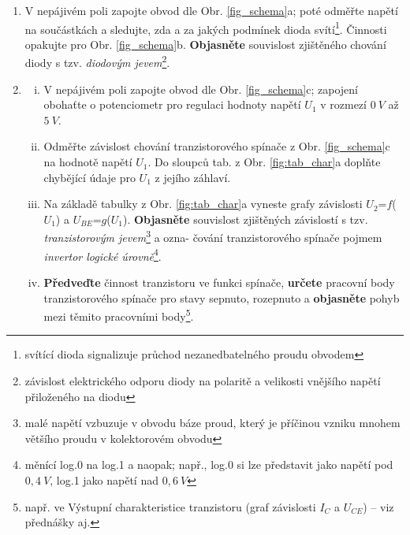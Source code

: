 \documentclass[a4paper, 11pt]{report}
\begin{document}
\begin{enumerate}[\bf {Experiment} 1:]

\item 
V nepájivém poli zapojte obvod dle Obr. \ref{fig_schema}a; 
poté
odměřte napětí na součástkách 
a sledujte, zda a za jakých podmínek dioda svítí\footnote{svítící dioda signalizuje průchod nezanedbatelného proudu obvodem}.
Činnosti opakujte pro Obr. \ref{fig_schema}b.
{\bf Objasněte} souvislost zjištěného chování diody s tzv. \emph{diodovým jevem}\footnote{závislost elektrického odporu diody na polaritě a velikosti vnějšího napětí přiloženého na diodu}.

\item 
\begin{enumerate}[i)]
\item
V nepájivém poli zapojte obvod dle Obr. \ref{fig_schema}c; 
zapojení obohaťte o potenciometr pro regulaci hodnoty napětí $U_1$
v rozmezí $0~V$ až $5~V$.

\item
Odměřte závislost chování tranzistorového spínače z Obr. \ref{fig_schema}c
na hodnotě napětí $U_1$. 
Do sloupců tab. z Obr. \ref{fig:tab_char}a 
doplňte 
chybějící údaje pro $U_1$ z jejího záhlaví.

\item Na základě tabulky z Obr. \ref{fig:tab_char}a vyneste grafy závislosti $U_2$=$f$($U_1$) a $U_{BE}$=$g$($U_1$).
{\bf Objasněte} souvislost zjištěných závislostí s tzv. \emph{tranzistorovým jevem}\footnote{malé napětí vzbuzuje v obvodu báze proud, který je příčinou vzniku mnohem většího proudu v kolektorovém obvodu}
a
ozna- čování tranzistorového spínače pojmem \emph{invertor logické úrovně}\footnote{měnící log.0 na log.1 a naopak; např., log.0 si lze představit jako napětí pod $0,4~V$, log.1 jako napětí nad $0,6~V$}.

\item 
{\bf Předveďte} činnost tranzistoru ve funkci spínače, 
{\bf určete} 
pracovní body 
tranzistorového spínače
pro stavy sepnuto, rozepnuto
a
{\bf objasněte} pohyb mezi těmito pracovními body\footnote{např. ve Výstupní charakteristice  tranzistoru (graf závislosti $I_C$ a $U_{CE}$) -- viz přednášky aj.}. 

\end{enumerate}




\end{enumerate}
\end{document}
